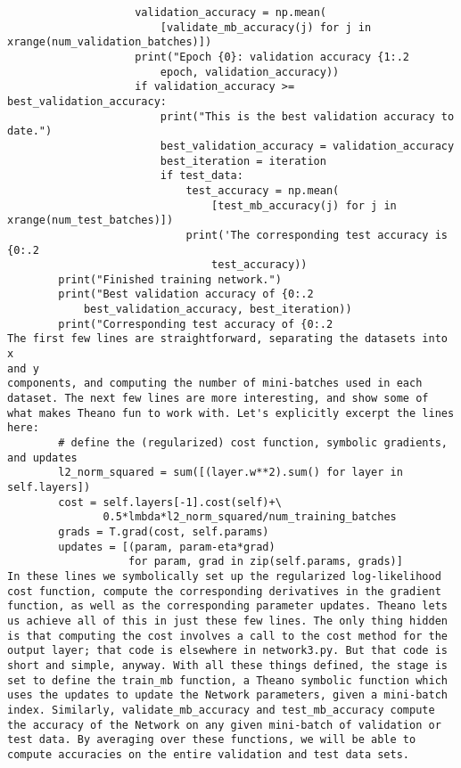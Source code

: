 \begin{lstlisting}
                    validation_accuracy = np.mean(
                        [validate_mb_accuracy(j) for j in xrange(num_validation_batches)])
                    print("Epoch {0}: validation accuracy {1:.2
                        epoch, validation_accuracy))
                    if validation_accuracy >= best_validation_accuracy:
                        print("This is the best validation accuracy to date.")
                        best_validation_accuracy = validation_accuracy
                        best_iteration = iteration
                        if test_data:
                            test_accuracy = np.mean(
                                [test_mb_accuracy(j) for j in xrange(num_test_batches)])
                            print('The corresponding test accuracy is {0:.2
                                test_accuracy))
        print("Finished training network.")
        print("Best validation accuracy of {0:.2
            best_validation_accuracy, best_iteration))
        print("Corresponding test accuracy of {0:.2
The first few lines are straightforward, separating the datasets into x
and y
components, and computing the number of mini-batches used in each dataset. The next few lines are more interesting, and show some of what makes Theano fun to work with. Let's explicitly excerpt the lines here:
        # define the (regularized) cost function, symbolic gradients, and updates
        l2_norm_squared = sum([(layer.w**2).sum() for layer in self.layers])
        cost = self.layers[-1].cost(self)+\
               0.5*lmbda*l2_norm_squared/num_training_batches
        grads = T.grad(cost, self.params)
        updates = [(param, param-eta*grad) 
                   for param, grad in zip(self.params, grads)]
In these lines we symbolically set up the regularized log-likelihood cost function, compute the corresponding derivatives in the gradient function, as well as the corresponding parameter updates. Theano lets us achieve all of this in just these few lines. The only thing hidden is that computing the cost involves a call to the cost method for the output layer; that code is elsewhere in network3.py. But that code is short and simple, anyway. With all these things defined, the stage is set to define the train_mb function, a Theano symbolic function which uses the updates to update the Network parameters, given a mini-batch index. Similarly, validate_mb_accuracy and test_mb_accuracy compute the accuracy of the Network on any given mini-batch of validation or test data. By averaging over these functions, we will be able to compute accuracies on the entire validation and test data sets.

\end{lstlisting}
